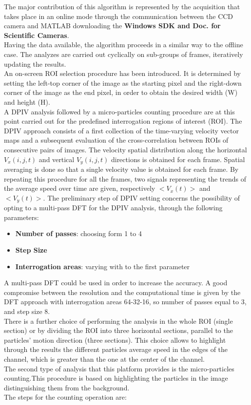 \documentclass[journal]{IEEEtran}
\theoremstyle{definition}
\theoremstyle{remark}
\begin{document}
The major contribution of this algorithm is represented by the acquisition that takes place in an online mode through the communication between the CCD camera and MATLAB downloading the \textbf{Windows SDK and Doc. for Scientific Cameras}.
\\Having the data available, the algorithm proceeds in a similar way to the offline case. The analyzes are carried out cyclically on sub-groups of frames, iteratively updating the results.
\\An on-screen ROI selection procedure has been introduced. It is determined by setting the left-top
corner of the image as the starting pixel and the right-down corner of the image as the end pixel, in order to obtain the desired width (W) and height (H). 
\\A DPIV analysis followed by a micro-particles counting procedure are at this point carried out for the predefined interrogation regions of interest (ROI). The DPIV approach consists of a first collection of the
time-varying velocity vector maps and a subsequent evaluation of the cross-correlation between ROIs of consecutive pairs of images. The velocity spatial distribution along the horizontal $V_x(i,j,t)$ and vertical $V_y(i,j,t)$ directions is obtained for each frame. Spatial averaging is done so that a single velocity value is obtained for each frame. By repeating this procedure for all the frames, two signals representing the trends of the average speed over time are given, respectively $<V_x(t)>$ and $<V_y(t)>$.
The preliminary step of DPIV setting concerns the possibility of opting to a multi-pass DFT for the DPIV analysis, through the following parameters: 

\begin{itemize}
	\item \textbf{Number of passes}: choosing form 1 to 4
	\item \textbf{Step Size}
	\item \textbf{Interrogation areas}: varying with to the first parameter
\end{itemize}

A multi-pass DFT could be used in order to increase the accuracy. A good compromise between the resolution and the computational time is given by the DFT approach with interrogation areas 64-32-16, so number of passes equal to 3, and step size 8. 
\\There is a further choice of performing the analysis in the whole ROI (single section) or by dividing the ROI into three horizontal sections, parallel to the particles' motion direction (three sections). This choice allows to highlight through the results the different particles average speed in the edges of the channel, which is greater than the one at the center of the channel.
\\The second type of analysis that this platform provides is the micro-particles counting.This procedure is based on highlighting the particles in the image distinguishing them from the background.
 \\The steps for the counting operation are:
 
\end{document}
